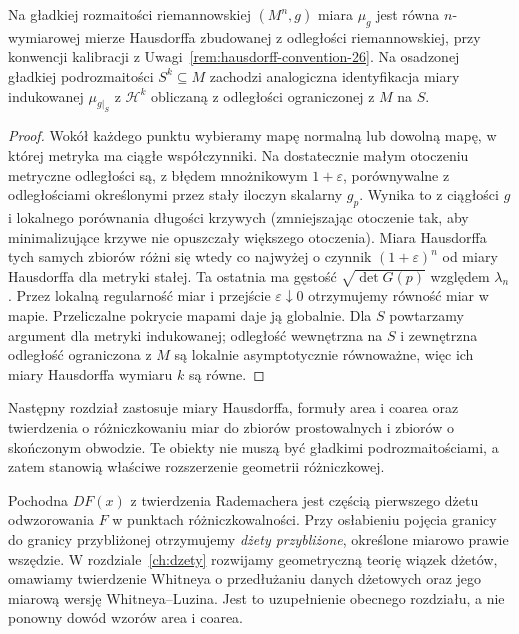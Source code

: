 \begin{wniosek}
\label{cor:riemann-hausdorff-28}
Na gładkiej rozmaitości riemannowskiej $(M^n,g)$
miara $\mu_g$ jest równa $n$-wymiarowej mierze
Hausdorffa zbudowanej z odległości riemannowskiej,
przy konwencji kalibracji z
Uwagi~\ref{rem:hausdorff-convention-26}. Na osadzonej
gładkiej podrozmaitości $S^k\subseteq M$ zachodzi
analogiczna identyfikacja miary indukowanej
$\mu_{g|_S}$ z $\mathcal H^k$ obliczaną
z odległości ograniczonej z $M$ na $S$.
\end{wniosek}
\begin{proof}
Wokół każdego punktu wybieramy mapę normalną
lub dowolną mapę, w której metryka ma ciągłe
współczynniki. Na dostatecznie małym otoczeniu
metryczne odległości są, z błędem mnożnikowym
$1+\varepsilon$, porównywalne z odległościami
określonymi przez stały iloczyn skalarny
$g_p$. Wynika to z ciągłości $g$ i
lokalnego porównania długości krzywych
(zmniejszając otoczenie tak, aby minimalizujące
krzywe nie opuszczały większego otoczenia).
Miara Hausdorffa tych samych zbiorów różni się
wtedy co najwyżej o czynnik $(1+\varepsilon)^n$
od miary Hausdorffa dla metryki stałej.
Ta ostatnia ma gęstość $\sqrt{\det G(p)}$
względem $\lambda_n$. Przez lokalną
regularność miar i przejście $\varepsilon\downarrow0$
otrzymujemy równość miar w mapie. Przeliczalne
pokrycie mapami daje ją globalnie.
Dla $S$ powtarzamy argument dla metryki
indukowanej; odległość wewnętrzna na $S$
i zewnętrzna odległość ograniczona z $M$
są lokalnie asymptotycznie równoważne,
więc ich miary Hausdorffa wymiaru $k$ są równe.
\end{proof}

\begin{uwaga}
Następny rozdział zastosuje miary Hausdorffa,
formuły area i coarea oraz twierdzenia o
różniczkowaniu miar do zbiorów prostowalnych
i zbiorów o skończonym obwodzie. Te obiekty
nie muszą być gładkimi podrozmaitościami,
a zatem stanowią właściwe rozszerzenie
geometrii różniczkowej.
\end{uwaga}

\begin{uwaga}
Pochodna $DF(x)$ z twierdzenia Rademachera jest częścią
pierwszego dżetu odwzorowania $F$ w punktach różniczkowalności.
Przy osłabieniu pojęcia granicy do granicy przybliżonej otrzymujemy
\emph{dżety przybliżone}, określone miarowo prawie wszędzie.
W rozdziale~\ref{ch:dzety} rozwijamy geometryczną teorię wiązek
dżetów, omawiamy twierdzenie Whitneya o przedłużaniu danych
dżetowych oraz jego miarową wersję Whitneya--Luzina.
Jest to uzupełnienie obecnego rozdziału, a nie ponowny dowód
wzorów area i coarea.
\end{uwaga}
